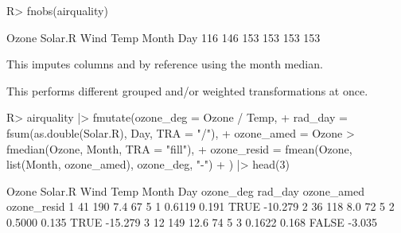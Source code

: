\documentclass[nojss]{jss} %
\begin{document}
%
\begin{Schunk}
\begin{Sinput}
R> fnobs(airquality)
\end{Sinput}
\begin{Soutput}
  Ozone Solar.R    Wind    Temp   Month     Day 
    116     146     153     153     153     153 
\end{Soutput}
\end{Schunk}
This imputes columns  and  by reference using the month median.
\begin{Schunk}
\end{Schunk}
This performs different grouped and/or weighted transformations at once.
\begin{Schunk}
\begin{Sinput}
R> airquality |> fmutate(ozone_deg = Ozone / Temp,
+    rad_day = fsum(as.double(Solar.R), Day, TRA = "/"),
+    ozone_amed = Ozone > fmedian(Ozone, Month, TRA = "fill"),
+    ozone_resid = fmean(Ozone, list(Month, ozone_amed), ozone_deg, "-")
+    ) |> head(3)
\end{Sinput}
\begin{Soutput}
  Ozone Solar.R Wind Temp Month Day ozone_deg rad_day ozone_amed ozone_resid
1    41     190  7.4   67     5   1    0.6119   0.191       TRUE     -10.279
2    36     118  8.0   72     5   2    0.5000   0.135       TRUE     -15.279
3    12     149 12.6   74     5   3    0.1622   0.168      FALSE      -3.035
\end{Soutput}
\end{Schunk}
%
\end{document}
